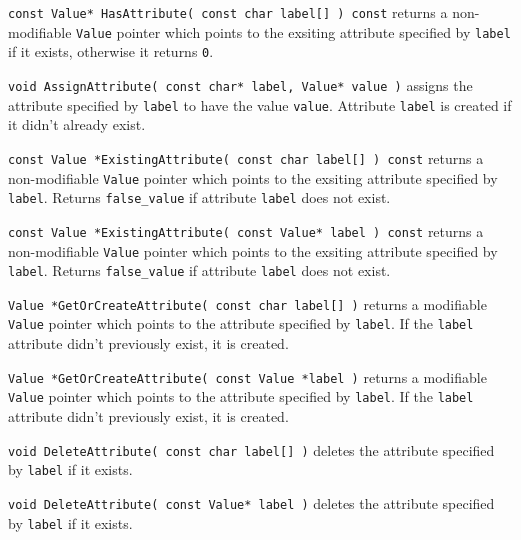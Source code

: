 \begin{sloppy}
\begin{list}{}{}

\item[{\tt const Value* HasAttribute( const char label[] ) const}] returns
a non-modifiable {\tt Value} pointer which points to the exsiting 
attribute specified by {\tt label} if it exists, otherwise it returns
{\tt 0}.

\item[{\tt void AssignAttribute( const char* label, Value* value )}] assigns
the attribute specified by {\tt label} to have the value {\tt value}. Attribute
{\tt label} is created if it didn't already exist.

\item[{\tt const Value *ExistingAttribute( const char label[] ) const}] returns
a non-modifiable {\tt Value} pointer which points to the exsiting 
attribute specified by {\tt label}. Returns {\tt false\_value} if
attribute {\tt label} does not exist.

\item[{\tt const Value *ExistingAttribute( const Value* label ) const}] returns
a non-modifiable {\tt Value} pointer which points to the exsiting
attribute specified by {\tt label}. Returns {\tt false\_value} if
attribute {\tt label} does not exist.

\item[{\tt Value *GetOrCreateAttribute( const char label[] )}] returns a
modifiable {\tt Value} pointer which points to the attribute specified
by {\tt label}. If the {\tt label} attribute didn't previously exist, it
is created.

\item[{\tt Value *GetOrCreateAttribute( const Value *label )}] returns a
modifiable {\tt Value} pointer which points to the attribute specified
by {\tt label}. If the {\tt label} attribute didn't previously exist, it
is created.

\item[{\tt void DeleteAttribute( const char label[] )}] deletes
the attribute specified by {\tt label} if it exists.

\item[{\tt void DeleteAttribute( const Value* label )}] deletes
the attribute specified by {\tt label} if it exists.

\end{list}
\end{sloppy}

